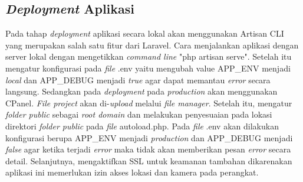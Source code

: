 \subsection{\textit{Deployment} Aplikasi}
Pada tahap \textit{deployment} aplikasi secara lokal akan menggunakan Artisan CLI yang merupakan salah satu fitur dari Laravel. Cara menjalankan aplikasi dengan server lokal dengan mengetikkan \textit{command line} "php artisan serve". Setelah itu mengatur konfigurasi pada \textit{file} .env yaitu mengubah value APP\_ENV menjadi \textit{local} dan APP\_DEBUG menjadi \textit{true} agar dapat memantau \textit{error} secara langsung. Sedangkan pada \textit{deployment} pada \textit{production} akan menggunakan CPanel. \textit{File project} akan di-\textit{upload} melalui \textit{file manager}. Setelah itu, mengatur \textit{folder public} sebagai \textit{root domain} dan melakukan penyesuaian pada lokasi direktori \textit{folder public} pada \textit{file} autoload.php. Pada \textit{file} .env akan dilakukan konfigurasi berupa APP\_ENV menjadi \textit{production} dan APP\_DEBUG menjadi \textit{false} agar ketika terjadi \textit{error} maka tidak akan memberikan pesan \textit{error} secara detail. Selanjutnya, mengaktifkan SSL untuk keamanan tambahan dikarenakan aplikasi ini memerlukan izin akses lokasi dan kamera pada perangkat.